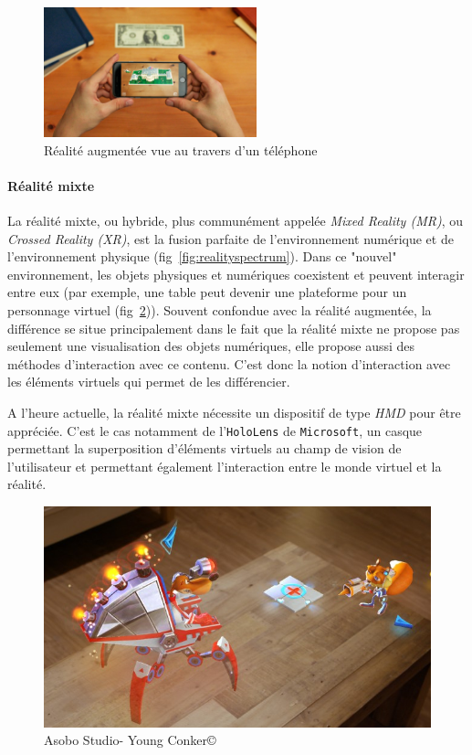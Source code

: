 \begin{figure}[H]
\centering
\includegraphics[width=0.55\textwidth]{images/AR}
\caption{Réalité augmentée vue au travers d'un téléphone\protect\footnotemark}\label{fig:AR}
\end{figure}

\paragraph{Réalité mixte}
La réalité mixte, ou hybride, plus communément appelée \emph{Mixed Reality (MR)}, ou \emph{Crossed Reality (XR)}, est la fusion parfaite de l'environnement numérique et de l'environnement physique (fig~\ref{fig:realityspectrum}). Dans ce "nouvel" environnement, les objets physiques et numériques coexistent et peuvent interagir entre eux (par exemple, une table peut devenir une plateforme pour un personnage virtuel (fig~\ref{fig:youngconker})). Souvent confondue avec la réalité augmentée, la différence se situe principalement dans le fait que la réalité mixte ne propose pas seulement une visualisation des objets numériques, elle propose aussi des méthodes d'interaction avec ce contenu. C'est donc la notion d'interaction avec les éléments virtuels qui permet de les différencier. 

A l'heure actuelle, la réalité mixte nécessite un dispositif de type \emph{HMD} pour être appréciée. C'est le cas notamment de l'\texttt{HoloLens} de \texttt{Microsoft}, un casque permettant la superposition d'éléments virtuels au champ de vision de l'utilisateur et permettant également l'interaction entre le monde virtuel et la réalité.

\begin{figure}[H]
\centering
\includegraphics[scale=0.4]{images/youngconker}
\caption{Asobo Studio\texttrademark - Young Conker\copyright}
\label{fig:youngconker}
\end{figure}

